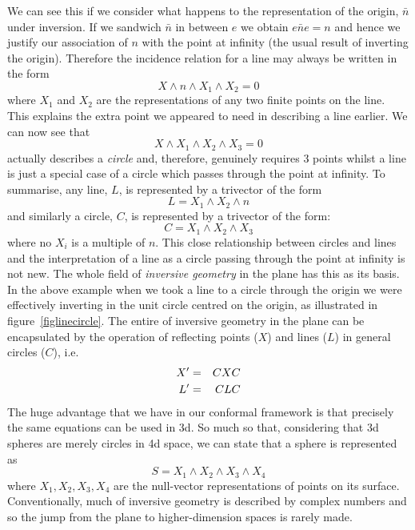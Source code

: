 We can see this if we consider what happens to the representation of the
origin, $\bar{n}$ under inversion. If we sandwich $\bar{n}$ in between $e$
we obtain $e\bar{n}e = n$ and hence we justify our association of $n$
with the point at infinity (the usual result of inverting the origin).
Therefore the incidence relation for a line may always be written in the
form
%
\begin{equation}
    X \wedge n \wedge X_1 \wedge X_2 = 0
    \end{equation}
%
where $X_1$ and $X_2$ are the representations of any two finite points 
on the line. This explains the extra point we appeared to need in
describing a line earlier. We can now see that
%
\[     X \wedge X_1 \wedge X_2 \wedge X_3 = 0 \]
%
actually describes a \emph{circle} and, therefore, genuinely requires 3 points
whilst a line is just a special case of a circle which passes through the point
at infinity.  To summarise, any line, $L$, is represented by a trivector of the
form
%
\begin{equation}
    L =  X_1 \wedge X_2 \wedge n
    \end{equation}
%
and similarly a circle, $C$, is represented by a trivector
of the form:
%
\begin{equation}
    C =  X_1 \wedge X_2 \wedge X_3
    \end{equation}
%
where no $X_i$ is a multiple of $n$. This close
relationship between circles and lines and the
interpretation of a line as a circle passing through the
point at infinity is not new. The whole field of
\emph{inversive geometry} \cite{Brannan} in the plane has
this as its basis. In the above example when we took a
line to a circle through the origin we were effectively
inverting in the unit circle centred on the origin, as
illustrated in figure~\ref{figlinecircle}. The entire of
inversive geometry in the plane can be encapsulated by
the operation of reflecting points ($X$) and lines ($L$)
in general circles ($C$), i.e.
%
\begin{eqnarray}
   X' & = & CXC  \nonumber \\
   L' & = & CLC \nonumber
   \end{eqnarray}
%
The huge advantage that we have in our conformal
framework is that precisely the same equations can be
used in 3d. So much so that, considering that 3d spheres
are merely circles in 4d space, we can state that a sphere
is represented as 
%
\begin{equation}
    S =  X_1 \wedge X_2 \wedge X_3 \wedge X_4
    \end{equation}
%
where $X_1, X_2, X_3, X_4$ are the null-vector representations
of points on its surface.
Conventionally, much of inversive geometry
is described by complex numbers and so the jump from the
plane to higher-dimension spaces is rarely made.


